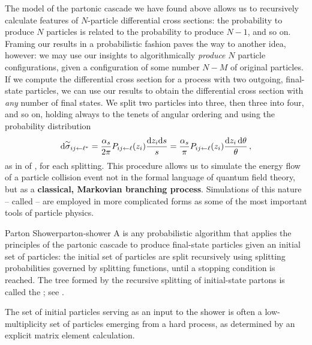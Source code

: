 The model of the partonic cascade we have found above allows us to recursively calculate features of \(N\)-particle differential cross sections:
%
the probability to produce \(N\) particles is related to the probability to produce \(N-1\), and so on.
%
Framing our results in a probabilistic fashion paves the way to another idea, however:
%
we may use our insights to algorithmically \textit{produce} \(N\) particle configurations, given a configuration of some number \(N-M\) of original particles.
%
If we compute the differential cross section for a process with two outgoing, final-state particles, we can use our results to obtain the differential cross section with \textit{any} number of final states.
%
We split two particles into three, then three into four, and so on, holding always to the tenets of angular ordering and using the probability distribution
\begin{align}
    \label{eq:splitting-prob-ch3}
    \dsigmatilde_{ij \leftarrow \ell^*}
    =
    \frac{\alpha_s}{2\pi}
    P_{ij \leftarrow \ell}(z_i) \frac{\dd z_i \dd s}{s}
    =
    \frac{\alpha_s}{\pi}
    P_{ij \leftarrow \ell}(z_i) \frac{\dd z_i \, \dd \theta}{\theta}
    \,,
\end{align}
as in  of , for each splitting.
%
This procedure allows us to simulate the energy flow of a particle collision event not in the formal language of quantum field theory, but as a \textbf{classical, Markovian branching process}.
%
Simulations of this nature -- called  -- are employed in more complicated forms as some of the most important tools of particle physics.


\begin{definitionbox}{Parton Shower}{parton-shower}
    A  is any probabilistic algorithm that applies the principles of the partonic cascade to produce final-state particles given an initial set of particles:
    the initial set of particles are split recursively using splitting probabilities governed by splitting functions, until a stopping condition is reached.
    The tree formed by the recursive splitting of initial-state partons is called the ;
    see .

    The set of initial particles serving as an input to the shower is often a low-multiplicity set of particles emerging from a hard process, as determined by an explicit matrix element calculation.
\end{definitionbox}


